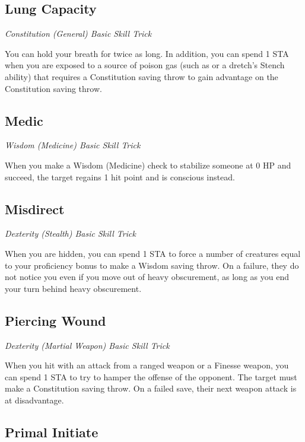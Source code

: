 \subsection{Lung Capacity}\label{st:lung-capacity}

\textit{Constitution (General) Basic Skill Trick}

You can hold your breath for twice as long. In addition, you can spend 1 STA when you are exposed to a source of poison gas (such as  or a dretch's Stench ability) that requires a Constitution saving throw to gain advantage on the Constitution saving throw. 

\subsection{Medic}\label{st:medic}

\textit{Wisdom (Medicine) Basic Skill Trick}

When you make a Wisdom (Medicine) check to stabilize someone at 0 HP and succeed, the target regains 1 hit point and is conscious instead.

\subsection{Misdirect}\label{st:misdirect}

\textit{Dexterity (Stealth) Basic Skill Trick}

When you are hidden, you can spend 1 STA to force a number of creatures equal to your proficiency bonus to make a Wisdom saving throw. On a failure, they do not notice you even if you move out of heavy obscurement, as long as you end your turn behind heavy obscurement.

\subsection{Piercing Wound}

\textit{Dexterity (Martial Weapon) Basic Skill Trick}

When you hit with an attack from a ranged weapon or a Finesse weapon, you can spend 1 STA to try to hamper the offense of the opponent. The target must make a Constitution saving throw. On a failed save, their next weapon attack is at disadvantage.

\subsection{Primal Initiate}

